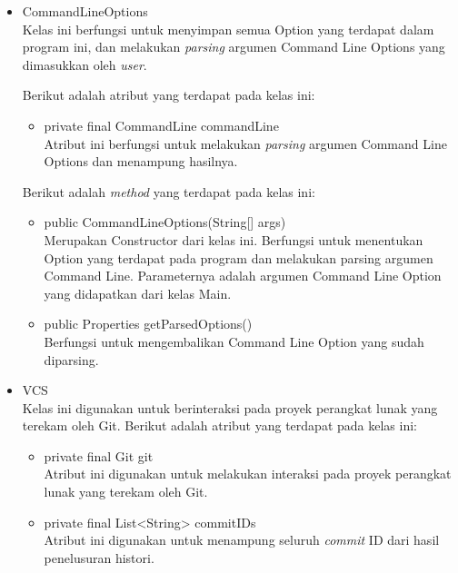 \begin{itemize}
\item CommandLineOptions\\
Kelas ini berfungsi untuk menyimpan semua Option yang terdapat dalam program ini, dan melakukan \textit{parsing} argumen Command Line Options yang dimasukkan oleh \textit{user}.  

Berikut adalah atribut yang terdapat pada kelas ini:
\begin{itemize}
    \item private final CommandLine commandLine\\
    Atribut ini berfungsi untuk melakukan \textit{parsing} argumen Command Line Options dan menampung hasilnya. 
\end{itemize}
Berikut adalah \textit{method} yang terdapat pada kelas ini:
\begin{itemize}
\item public CommandLineOptions(String[] args)\\
Merupakan Constructor dari kelas ini. Berfungsi untuk menentukan Option yang terdapat pada program dan melakukan parsing argumen Command Line. Parameternya adalah argumen Command Line Option yang didapatkan dari
kelas Main.
\item public Properties getParsedOptions()\\
Berfungsi untuk mengembalikan Command Line Option yang sudah diparsing.
\end{itemize}

\item VCS\\
Kelas ini digunakan untuk berinteraksi pada proyek perangkat lunak yang terekam oleh Git. Berikut adalah atribut yang terdapat pada kelas ini:
\begin{itemize}
   \item  private final Git git\\
   Atribut ini digunakan untuk melakukan interaksi pada proyek perangkat lunak yang terekam oleh Git.
   \item private final List<String> commitIDs\\
   Atribut ini digunakan untuk menampung seluruh \textit{commit} ID dari hasil penelusuran histori.   
\end{itemize}


\end{itemize}
